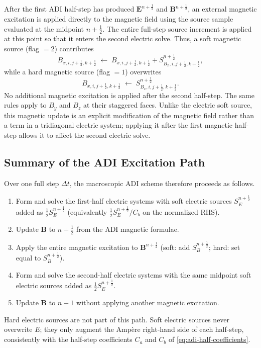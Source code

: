 \documentclass{article}
\numberwithin{equation}{section}
\numberwithin{figure}{section}
\begin{document}
After the first ADI half-step has produced $\mathbf{E}^{n+\frac12}$ and $\mathbf{B}^{n+\frac12}$, an external magnetic excitation is applied directly to the magnetic field using the source sample evaluated at the midpoint $n+\tfrac12$. The entire full-step source increment is applied at this point so that it enters the second electric solve. Thus, a soft magnetic source (flag $=2$) contributes
\begin{equation}
    B_{x,i,j+\tfrac12,k+\tfrac12}
    \;\leftarrow\;
    B_{x,i,j+\tfrac12,k+\tfrac12}
    + S_{B_x,i,j+\tfrac12,k+\tfrac12}^{n+\frac12},
\end{equation}
while a hard magnetic source (flag $=1$) overwrites
\begin{equation}
    B_{x,i,j+\tfrac12,k+\tfrac12}
    \;\leftarrow\;
    S_{B_x,i,j+\tfrac12,k+\tfrac12}^{n+\frac12}.
\end{equation}
No additional magnetic excitation is applied after the second half-step. The same rules apply to $B_y$ and $B_z$ at their staggered faces. Unlike the electric soft source, this magnetic update is an explicit modification of the magnetic field rather than a term in a tridiagonal electric system; applying it after the first magnetic half-step allows it to affect the second electric solve.

\subsection{Summary of the ADI Excitation Path}

Over one full step $\Delta t$, the macroscopic ADI scheme therefore proceeds as follows.
\begin{enumerate}
    \item Form and solve the first-half electric systems with soft electric sources $S_E^{n+\frac12}$ added as $\tfrac12 S_E^{n+\frac12}$ (equivalently $\tfrac12 S_E^{n+\frac12}/C_b$ on the normalized RHS).
    \item Update $\mathbf{B}$ to $n+\tfrac12$ from the ADI magnetic formulae.
    \item Apply the entire magnetic excitation to $\mathbf{B}^{n+\frac12}$ (soft: add $S_B^{n+\frac12}$; hard: set equal to $S_B^{n+\frac12}$).
    \item Form and solve the second-half electric systems with the same midpoint soft electric sources added as $\tfrac12 S_E^{n+\frac12}$.
    \item Update $\mathbf{B}$ to $n+1$ without applying another magnetic excitation.
\end{enumerate}
Hard electric sources are not part of this path. Soft electric sources never overwrite $E$; they only augment the Amp\`ere right-hand side of each half-step, consistently with the half-step coefficients $C_a$ and $C_b$ of \eqref{eq:adi-half-coefficients}.
\end{document}
